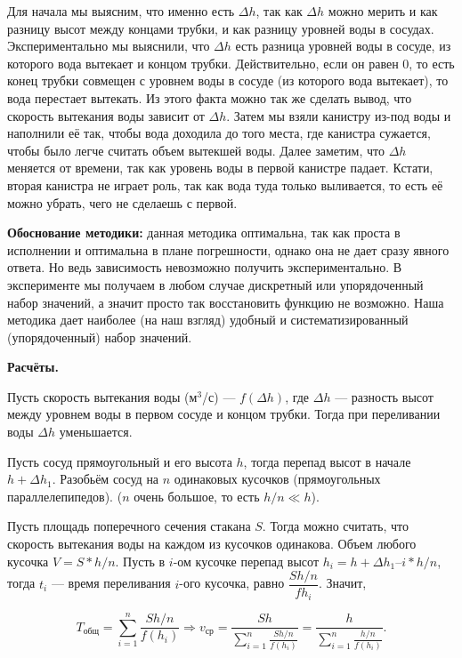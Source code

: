 Для начала мы выясним, что именно есть $\Delta h$, так как $\Delta h$
можно мерить и как разницу высот между концами трубки, и как разницу
уровней воды в сосудах. Экспериментально мы выяснили, что $\Delta h$
есть разница уровней воды в сосуде, из которого вода вытекает и концом
трубки. Действительно, если он равен 0, то есть конец трубки совмещен
с уровнем воды в сосуде (из которого вода вытекает), то вода перестает
вытекать. Из этого факта можно так же сделать вывод, что скорость
вытекания воды зависит от $\Delta h$. Затем мы взяли канистру из-под
воды и наполнили её так, чтобы вода доходила до того места, где
канистра сужается, чтобы было легче считать объем вытекшей воды. Далее
заметим, что $\Delta h$ меняется от времени, так как уровень воды в первой
канистре падает. Кстати, вторая канистра не играет роль, так как вода
туда только выливается, то есть её можно убрать, чего не сделаешь с
первой.

\textbf{Обоснование методики:} данная методика оптимальна, так как
проста в исполнении и оптимальна в плане погрешности, однако она не
дает сразу явного ответа. Но ведь зависимость невозможно получить
экспериментально. В эксперименте мы получаем в любом случае дискретный
или упорядоченный набор значений, а значит просто так восстановить
функцию не возможно. Наша методика дает наиболее (на наш взгляд)
удобный и систематизированный (упорядоченный) набор значений.

\begin{center}
  \textbf{Расчёты.}
\end{center}

Пусть скорость вытекания воды (м${}^3$/с) --- $f(\Delta h)$, где
$\Delta h$ --- разность высот между уровнем воды в первом сосуде и
концом трубки. Тогда при переливании воды $\Delta h$ уменьшается.

Пусть сосуд прямоугольный и его высота $h$, тогда перепад высот в
начале $h+\Delta h_1$. Разобьём сосуд на $n$ одинаковых кусочков
(прямоугольных параллелепипедов). ($n$ очень большое, то есть $h/n \ll
h$).

Пусть площадь поперечного сечения стакана $S$. Тогда можно считать,
что скорость вытекания воды на каждом из кусочков одинакова. Объем
любого кусочка $V=S*h/n$. Пусть в $i$-ом кусочке перепад высот $h_i= h
+ \Delta h_1 – i*h/n$, тогда $t_i$ --- время переливания $i$-ого
кусочка, равно $\dfrac{Sh/n}{f{h_i}}$. Значит, 

\begin{equation}
  \label{eq:bz09_2_1}
   T_{\text{общ}} = \sum_{i=1}^{n} \frac{Sh/n}{f(h_i)} \Rightarrow
   v_{\text{ср}} = \frac{Sh}{\sum_{i=1}^{n} \frac{Sh/n}{f(h_i)}} =
   \frac{h}{\sum_{i=1}^n \frac{h/n}{f(h_i)}}. 
\end{equation}

